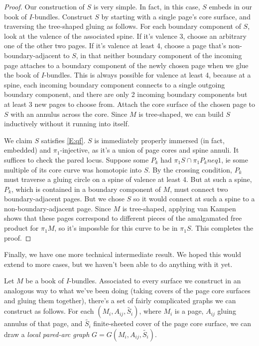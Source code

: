 \documentclass[12pt]{amsart}
\theoremstyle{definition}
\theoremstyle{remark}
\begin{document}
\begin{proof}

Our construction of $S$ is very simple. In fact, in this case, $S$ embeds in
our book of $I$-bundles. Construct $S$ by starting with a single page's core
surface, and traversing the tree-shaped gluing as follows. For each boundary
component of $S$, look at the valence of the associated spine. If it's valence
3, choose an arbitrary one of the other two pages. If it's valence at least 4,
choose a page that's non-boundary-adjacent to $S$, in that neither boundary
component of the incoming page attaches to a boundary component of the newly
chosen page when we glue the book of $I$-bundles. This is always possible for
valence at least 4, because at a spine, each incoming boundary component
connects to a single outgoing boundary component, and there are only 2 incoming
boundary components but at least 3 new pages to choose from. Attach the core
surface of the chosen page to $S$ with an annulus across the core. Since $M$ is
tree-shaped, we can build $S$ inductively without it running into itself.

We claim $S$ satisfies \eqref{E:qf}. $S$ is immediately properly immersed (in
fact, embedded) and $\pi_1$-injective, as it's a union of page cores and spine
annuli. It suffices to check the pared locus. Suppose some $P_k$ had $\pi_1S
\cap \pi_1P_k neq 1$, ie some multiple of its core curve was homotopic into
$S$. By the crossing condition, $P_k$ must traverse a gluing circle on a spine
of valence at least 4.  But at such a spine, $P_k$, which is contained in
a boundary component of $M$, must connect two boundary-adjacent pages. But we
chose $S$ so it would connect at such a spine to a non-boundary-adjacent page.
Since $M$ is tree-shaped, applying van Kampen shows that these pages correspond
to different pieces of the amalgamated free product for $\pi_1M$, so it's
impossble for this curve to be in $\pi_1S$. This completes the proof.

\end{proof}

Finally, we have one more technical intermediate result. We hoped this would
extend to more cases, but we haven't been able to do anything with it yet.

Let $M$ be a book of $I$-bundles. Associated to every surface we construct in
an analogous way to what we've been doing (taking covers of the page core
surfaces and gluing them together), there's a set of fairly complicated graphs
we can construct as follows. For each $(M_i,A_{ij},\widetilde{S_i})$, where
$M_i$ is a page, $A_{ij}$ gluing annulus of that page, and $\widetilde{S_i}$
finite-sheeted cover of the page core surface, we can draw a \emph{local
pared-arc graph} $G=G(M_i,A_{ij},\widetilde{S_i})$.
\end{document}
